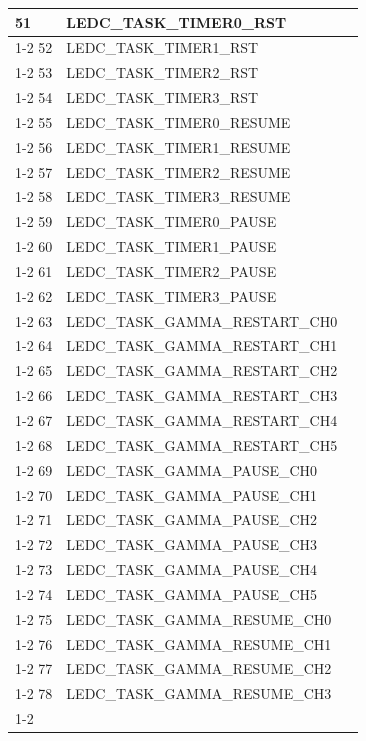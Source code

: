 \documentclass[main\_\_EN.tex]{subfiles}
\begin{document}
\begin{longtable}{ | l | l | l | }
51  & LEDC\_TASK\_TIMER0\_RST  & \\ \cline{1-2}
52  & LEDC\_TASK\_TIMER1\_RST  & \\ \cline{1-2}
53  & LEDC\_TASK\_TIMER2\_RST  & \\ \cline{1-2}
54  & LEDC\_TASK\_TIMER3\_RST  & \\ \cline{1-2}
55  & LEDC\_TASK\_TIMER0\_RESUME    & \\ \cline{1-2}
56  & LEDC\_TASK\_TIMER1\_RESUME    & \\ \cline{1-2}
57  & LEDC\_TASK\_TIMER2\_RESUME    & \\ \cline{1-2}
58  & LEDC\_TASK\_TIMER3\_RESUME    & \\ \cline{1-2}
59  & LEDC\_TASK\_TIMER0\_PAUSE& \\ \cline{1-2}
60  & LEDC\_TASK\_TIMER1\_PAUSE& \\ \cline{1-2}
61  & LEDC\_TASK\_TIMER2\_PAUSE& \\ \cline{1-2}
62  & LEDC\_TASK\_TIMER3\_PAUSE& \\ \cline{1-2}
63  & LEDC\_TASK\_GAMMA\_RESTART\_CH0      & \\ \cline{1-2}
64  & LEDC\_TASK\_GAMMA\_RESTART\_CH1      & \\ \cline{1-2}
65  & LEDC\_TASK\_GAMMA\_RESTART\_CH2      & \\ \cline{1-2}
66  & LEDC\_TASK\_GAMMA\_RESTART\_CH3      & \\ \cline{1-2}
67  & LEDC\_TASK\_GAMMA\_RESTART\_CH4      & \\ \cline{1-2}
68  & LEDC\_TASK\_GAMMA\_RESTART\_CH5      & \\ \cline{1-2}
69  & LEDC\_TASK\_GAMMA\_PAUSE\_CH0 & \\ \cline{1-2}
70  & LEDC\_TASK\_GAMMA\_PAUSE\_CH1 & \\ \cline{1-2}
71  & LEDC\_TASK\_GAMMA\_PAUSE\_CH2 & \\ \cline{1-2}
72  & LEDC\_TASK\_GAMMA\_PAUSE\_CH3 & \\ \cline{1-2}
73  & LEDC\_TASK\_GAMMA\_PAUSE\_CH4 & \\ \cline{1-2}
74  & LEDC\_TASK\_GAMMA\_PAUSE\_CH5 & \\ \cline{1-2}
75  & LEDC\_TASK\_GAMMA\_RESUME\_CH0& \\ \cline{1-2}
76  & LEDC\_TASK\_GAMMA\_RESUME\_CH1& \\ \cline{1-2}
77  & LEDC\_TASK\_GAMMA\_RESUME\_CH2& \\ \cline{1-2}
78  & LEDC\_TASK\_GAMMA\_RESUME\_CH3& \\ \cline{1-2}

\end{longtable}
\end{document}
